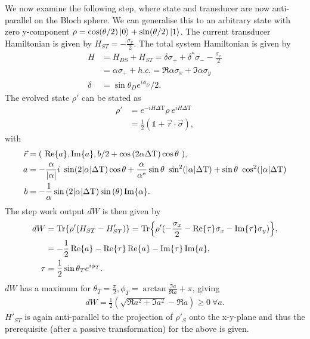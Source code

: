 \documentclass{article}
\begin{document}
We now examine the following step, where state and transducer are now anti-parallel on the Bloch sphere.
We can generalise this to an arbitrary state with zero y-component $\rho = \cos(\theta/2) \ket{0} + \sin(\theta/2) \ket{1}$.
The current transducer Hamiltonian is given by $H_{ST} = -\frac{\sigma_x}{2}$.
The total system Hamiltonian is given by
\begin{align*}
	H &= H_{DS} + H_{ST} =  \delta \sigma_+ + \delta^* \sigma_{-} - \frac{\sigma_x}{2} \\
	  &= \alpha \sigma_+ + h.c. = \Re{\alpha} \sigma_x + \Im{\alpha} \sigma_y \\
	 \delta &= \sin{\theta_D} e^{i\phi_D} / 2.
\end{align*}
The evolved state $\rho'$ can be stated as
\begin{align*}
	\rho' &= e^{-iH\Delta \mathrm{T}} \rho \ e^{iH\Delta \mathrm{T}} \\
	&=\frac{1}{2} (\mathbb{1} + \vec{r} \cdot \vec{\sigma}),       
\end{align*}
with
\begin{align*}
	\vec{r} &= ( \ \Re{a}, \Im{a},b/2 + \cos{(2 \alpha \Delta \mathrm{T})} \cos{\theta} \ ), \\
	a &= -\frac{\alpha}{\abs{\alpha}} i \ \sin(2 \abs{\alpha} \Delta \mathrm{T}) \cos{\theta} + \frac{\alpha}{\alpha^*} \sin{\theta} \ \sin^2(\abs{\alpha} \Delta \mathrm{T}) + \sin{\theta} \ \cos^2(\abs{\alpha} \Delta \mathrm{T}) \\
	b &= -\frac{1}{\alpha} \sin{(2 \abs{\alpha} \Delta \mathrm{T})} \sin{(\theta)} \Im{\alpha}.
\end{align*}
The step work output $dW$ is then given by
\begin{align*}
	dW &= \Tr{\rho' (H_{ST} - H'_{ST})} = \Tr{\rho' (-\frac{\sigma_x}{2} - \Re{\tau} \sigma_x - \Im{\tau} \sigma_y )}, \\
	   &= -\frac{1}{2} \Re{a} - \Re{\tau}\Re{a} - \Im{\tau} \Im{a}, \\
	\tau &= \frac{1}{2} \sin{\theta_T} e^{i\phi_T}. 
\end{align*}
$dW$ has a maximum for $\theta_T = \frac{\pi}{2}, \phi_T = \arctan{\frac{\Im{a}}{\Re{a}}} + \pi$, giving
\begin{align*}
	dW = \frac{1}{2}\left(\sqrt{\Re{a}^2 + \Im{a}^2} -\Re{a}\right) \geq 0 \ \forall a.
\end{align*}
$H'_{ST}$ is again anti-parallel to the projection of $\rho'_S$ onto the x-y-plane and thus the prerequisite (after a passive transformation) for the above is given.
\end{document}
